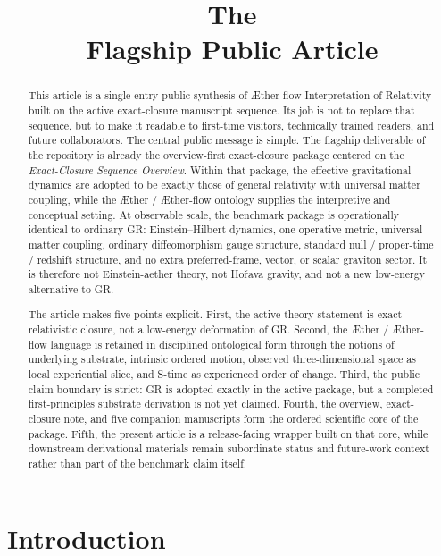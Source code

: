 \documentclass[11pt]{article}
\title{\textbf{The \TheoryName{}}\\[0.4em]
\large Flagship Public Article}
\author{}
\date{}
\newcommand{\Aether}{\AE{}ther}
\newcommand{\Aflow}{\AE{}ther-flow}
\newcommand{\TheoryName}{\Aflow{} Interpretation of Relativity}
\begin{document}
\maketitle

\begin{abstract}
This article is a single-entry public synthesis of \TheoryName{} built on the active exact-closure manuscript sequence. Its job is not to replace that sequence, but to make it readable to first-time visitors, technically trained readers, and future collaborators. The central public message is simple. The flagship deliverable of the repository is already the overview-first exact-closure package centered on the \emph{Exact-Closure Sequence Overview}. Within that package, the effective gravitational dynamics are adopted to be exactly those of general relativity with universal matter coupling, while the \Aether{} / \Aflow{} ontology supplies the interpretive and conceptual setting. At observable scale, the benchmark package is operationally identical to ordinary GR: Einstein--Hilbert dynamics, one operative metric, universal matter coupling, ordinary diffeomorphism gauge structure, standard null / proper-time / redshift structure, and no extra preferred-frame, vector, or scalar graviton sector. It is therefore not Einstein-aether theory, not Ho\v{r}ava gravity, and not a new low-energy alternative to GR.

The article makes five points explicit. First, the active theory statement is exact relativistic closure, not a low-energy deformation of GR. Second, the \Aether{} / \Aflow{} language is retained in disciplined ontological form through the notions of underlying substrate, intrinsic ordered motion, observed three-dimensional space as local experiential slice, and S-time as experienced order of change. Third, the public claim boundary is strict: GR is adopted exactly in the active package, but a completed first-principles substrate derivation is not yet claimed. Fourth, the overview, exact-closure note, and five companion manuscripts form the ordered scientific core of the package. Fifth, the present article is a release-facing wrapper built on that core, while downstream derivational materials remain subordinate status and future-work context rather than part of the benchmark claim itself.
\end{abstract}

\section{Introduction}
\end{document}
